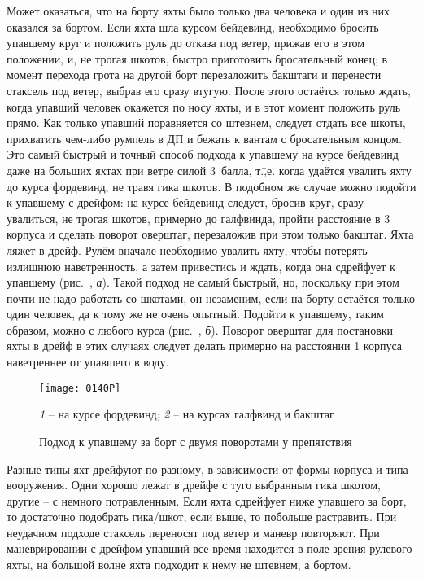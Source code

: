 Может оказаться, что на борту яхты было только два человека и один из
них оказался за бортом. Если яхта шла курсом бейдевинд, необходимо
бросить упавшему круг и положить руль до отказа под ветер, прижав его
в этом положении, и, не трогая шкотов, быстро приготовить бросательный
конец; в момент перехода грота на другой борт перезаложить бакштаги и
перенести стаксель под ветер, выбрав его сразу втугую. После этого
остаётся только ждать, когда упавший человек окажется по носу яхты, и
в этот момент положить руль прямо. Как только упавший поравняется со
штевнем, следует отдать все шкоты, прихватить чем-либо румпель в ДП и
бежать к вантам с бросательным концом. Это самый быстрый и точный
способ подхода к упавшему на курсе бейдевинд даже на больших яхтах при
ветре силой 3~балла, т.\=,е. когда удаётся увалить яхту до
курса фордевинд, не травя гика шкотов. В подобном же случае можно
подойти к упавшему с дрейфом: на курсе бейдевинд следует, бросив круг,
сразу увалиться, не трогая шкотов, примерно до галфвинда, пройти
расстояние в 3 корпуса и сделать поворот оверштаг, перезаложив
при этом только бакштаг. Яхта ляжет в дрейф. Рулём вначале необходимо
увалить яхту, чтобы потерять излишнюю наветренность, а затем
привестись и ждать, когда она сдрейфует к упавшему (рис.~,
\textit{а}). Такой подход не самый быстрый, но, поскольку при этом
почти не надо работать со шкотами, он незаменим, если на борту
остаётся только один человек, да к тому же не очень опытный. Подойти к
упавшему, таким образом, можно с любого курса (рис.~,
\textit{б}). Поворот оверштаг для постановки яхты в дрейф в этих
случаях следует делать примерно на расстоянии 1 корпуса наветреннее от
упавшего в воду.

\begin{figure}[htb]
  \centering{}
  \texttt{[image: 0140P]}
  \caption{Подход к упавшему за борт с двумя поворотами у препятствия}
  \label{fig:140}
  \small
  \centering{}
  \textit{1} \--- на курсе фордевинд; \textit{2} \--- на курсах галфвинд и бакштаг
\end{figure}

Разные типы яхт дрейфуют по-разному, в зависимости от формы корпуса и
типа вооружения. Одни хорошо лежат в дрейфе с туго выбранным гика
шкотом, другие \--- с немного потравленным. Если яхта сдрейфует ниже
упавшего за борт, то достаточно подобрать гика\-/шкот, если выше, то
побольше растравить. При неудачном подходе стаксель переносят под
ветер и маневр повторяют. При маневрировании с дрейфом упавший все
время находится в поле зрения рулевого яхты, на большой волне яхта
подходит к нему не штевнем, а бортом.

